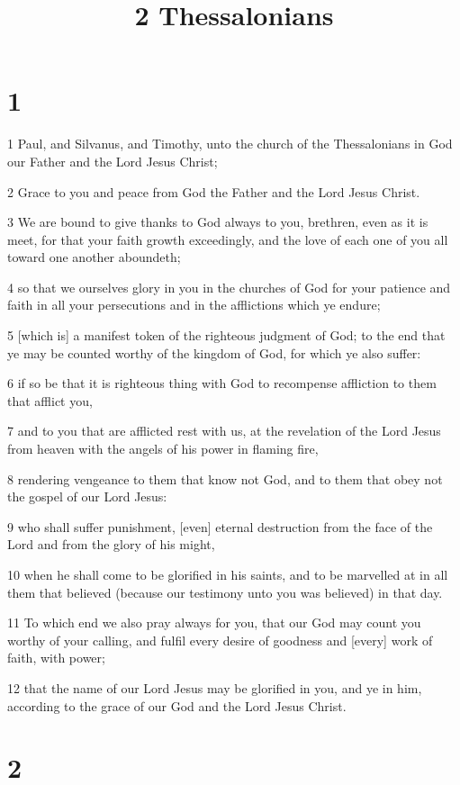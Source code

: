 

\title{2 Thessalonians}

\chapter{1}

\par 1 Paul, and Silvanus, and Timothy, unto the church of the Thessalonians in God our Father and the Lord Jesus Christ;
\par 2 Grace to you and peace from God the Father and the Lord Jesus Christ.
\par 3 We are bound to give thanks to God always to you, brethren, even as it is meet, for that your faith growth exceedingly, and the love of each one of you all toward one another aboundeth;
\par 4 so that we ourselves glory in you in the churches of God for your patience and faith in all your persecutions and in the afflictions which ye endure;
\par 5 [which is] a manifest token of the righteous judgment of God; to the end that ye may be counted worthy of the kingdom of God, for which ye also suffer:
\par 6 if so be that it is righteous thing with God to recompense affliction to them that afflict you,
\par 7 and to you that are afflicted rest with us, at the revelation of the Lord Jesus from heaven with the angels of his power in flaming fire,
\par 8 rendering vengeance to them that know not God, and to them that obey not the gospel of our Lord Jesus:
\par 9 who shall suffer punishment, [even] eternal destruction from the face of the Lord and from the glory of his might,
\par 10 when he shall come to be glorified in his saints, and to be marvelled at in all them that believed (because our testimony unto you was believed) in that day.
\par 11 To which end we also pray always for you, that our God may count you worthy of your calling, and fulfil every desire of goodness and [every] work of faith, with power;
\par 12 that the name of our Lord Jesus may be glorified in you, and ye in him, according to the grace of our God and the Lord Jesus Christ.

\chapter{2}

